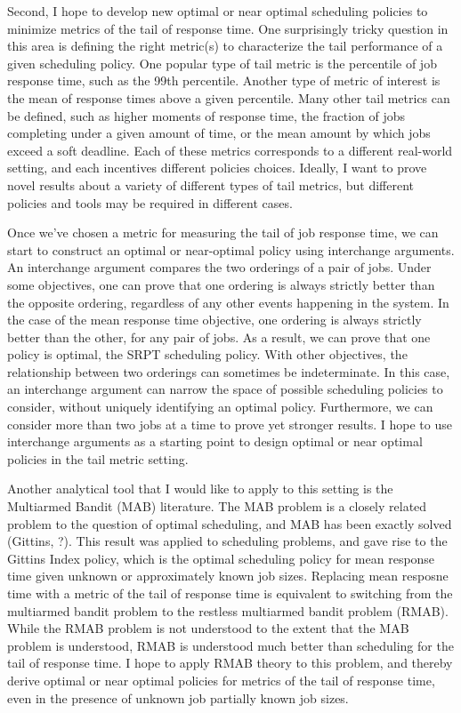 \documentclass[12pt]{article}
\begin{document}
Second, I hope to develop new optimal or near optimal scheduling policies to minimize metrics of the tail of response time. One surprisingly tricky question in this area is defining the right metric(s) to characterize the tail performance of a given scheduling policy. One popular type of tail metric is the percentile of job response time, such as the 99th percentile. Another type of metric of interest is the mean of response times above a given percentile. Many other tail metrics can be defined, such as higher moments of response time, the fraction of jobs completing under a given amount of time, or the mean amount by which jobs exceed a soft deadline. Each of these metrics corresponds to a different real-world setting, and each incentives different policies choices. Ideally, I want to prove novel results about a variety of different types of tail metrics, but different policies and tools may be required in different cases.

Once we’ve chosen a metric for measuring the tail of job response time, we can start to construct an optimal or near-optimal policy using interchange arguments. An interchange argument compares the two orderings of a pair of jobs. Under some objectives, one can prove that one ordering is always strictly better than the opposite ordering, regardless of any other events happening in the system. In the case of the mean response time objective, one ordering is always strictly better than the other, for any pair of jobs. As a result, we can prove that one policy is optimal, the SRPT scheduling policy. With other objectives, the relationship between two orderings can sometimes be indeterminate. In this case, an interchange argument can narrow the space of possible scheduling policies to consider, without uniquely identifying an optimal policy. Furthermore, we can consider more than two jobs at a time to prove yet stronger results. I hope to use interchange arguments as a starting point to design optimal or near optimal policies in the tail metric setting.

Another analytical tool that I would like to apply to this setting is the Multiarmed Bandit (MAB) literature. The MAB problem is a closely related problem to the question of optimal scheduling, and MAB has been exactly solved (Gittins, ?). This result was applied to scheduling problems, and gave rise to the Gittins Index policy, which is the optimal scheduling policy for mean response time given unknown or approximately known job sizes. Replacing mean resposne time with a metric of the tail of response time is equivalent to switching from the multiarmed bandit problem to the restless multiarmed bandit problem (RMAB). While the RMAB problem is not understood to the extent that the MAB problem is understood, RMAB is understood much better than scheduling for the tail of response time. I hope to apply RMAB theory to this problem, and thereby derive optimal or near optimal policies for metrics of the tail of response time, even in the presence of unknown job partially known job sizes.
\end{document}
